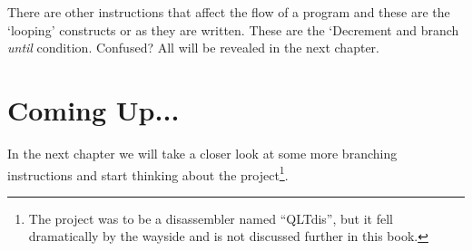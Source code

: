 There are other instructions that affect the flow of a program and
    these are the `looping' constructs or  as they are written. These are
    the `Decrement and branch \emph{until} condition. Confused? All will be revealed
    in the next chapter.

\section{Coming Up...}
\label{ch2-the-end}%

In the next chapter we will take a closer
    look at some more branching instructions and start thinking about the project\footnote{The project was to be a disassembler named ``QLTdis'', but it fell dramatically by the wayside and is not discussed further in this book.}.
